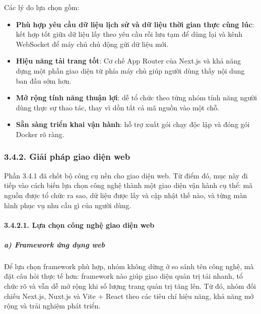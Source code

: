 \documentclass[a4paper]{extarticle}
\providecommand{\tightlist}{%
  \setlength{\itemsep}{0pt}\setlength{\parskip}{0pt}}
\begin{document}
Các lý do lựa chọn gồm:

\begin{itemize}
\tightlist
\item
  \textbf{Phù hợp yêu cầu dữ liệu lịch sử và dữ liệu thời gian thực cùng
  lúc}: kết hợp tốt giữa dữ liệu lấy theo yêu cầu rồi lưu tạm để dùng
  lại và kênh WebSocket để máy chủ chủ động gửi dữ liệu mới.
\item
  \textbf{Hiệu năng tải trang tốt}: Cơ chế App Router của Next.js và khả
  năng dựng một phần giao diện từ phía máy chủ giúp người dùng thấy nội
  dung ban đầu sớm hơn.
\item
  \textbf{Mở rộng tính năng thuận lợi}: dễ tổ chức theo từng nhóm tính năng
  người dùng thực sự thao tác, thay vì dồn tất cả mã nguồn vào một chỗ.
\item
  \textbf{Sẵn sàng triển khai vận hành}: hỗ trợ xuất gói chạy độc lập và
  đóng gói Docker rõ ràng.
\end{itemize}

\subsubsection{3.4.2. Giải pháp giao diện
web}\label{324-giux1ea3i-phuxe1p-frontend}

Phần 3.4.1 đã chốt bộ công cụ nền cho giao diện web. Từ điểm đó, mục
này đi tiếp vào cách biến lựa chọn công nghệ thành một giao diện vận
hành cụ thể: mã nguồn được tổ chức ra sao, dữ liệu được lấy và cập nhật
thế nào, và từng màn hình phục vụ nhu cầu gì của người dùng.

\paragraph{3.4.2.1. Lựa chọn công nghệ giao diện web}\label{3241-lux1ef1a-chux1ecdn-cuxf4ng-nghux1ec7-frontend-technology-selection}

\subparagraph{a) Framework ứng dụng
web}\label{a-framework-ux1ee9ng-dux1ee5ng-web}

Để lựa chọn framework phù hợp, nhóm không dừng ở so sánh tên công nghệ,
mà đặt câu hỏi thực tế hơn: framework nào giúp giao diện quản trị tải nhanh, tổ
chức rõ và vẫn dễ mở rộng khi số lượng trang quản trị tăng lên. Từ đó,
nhóm đối chiếu Next.js, Nuxt.js và Vite + React theo các tiêu chí hiệu
năng, khả năng mở rộng và trải nghiệm phát triển.
\end{document}
